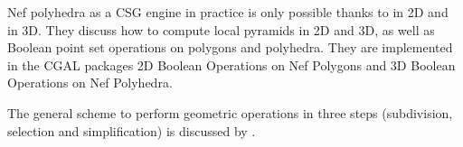 Nef polyhedra as a CSG engine in practice is only possible thanks to \citet{Seel01} in 2D and \citet{Hachenberger06} in 3D.
They discuss how to compute local pyramids in 2D and 3D, as well as Boolean point set operations on polygons and polyhedra.
They are implemented in the CGAL packages 2D Boolean Operations on Nef Polygons and 3D Boolean Operations on Nef Polyhedra.

The general scheme to perform geometric operations in three steps (subdivision, selection and simplification) is discussed by \citet{Rossignac89}.
